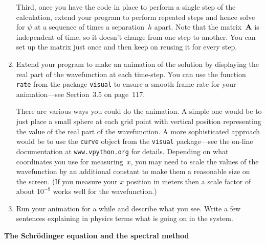 \documentclass[12pt]{article}
\begin{document}
\begin{exercises}
\begin{enumerate}
Third, once you have the code in place to perform a single step of the
calculation, extend your program to perform repeated steps and hence solve
for $\psi$ at a sequence of times a separation~$h$ apart.  Note that the
matrix~$\mathbf{A}$ is independent of time, so it doesn't change from one step
to another.  You can set up the matrix just once and then keep on reusing
it for every step.

\item Extend your program to make an animation of the solution by
  displaying the real part of the wavefunction at each time-step.  You can
  use the function \verb|rate| from the package \verb|visual| to ensure a
  smooth frame-rate for your animation---see Section~3.5 on page~117.

  There are various ways you could do the animation.  A simple one would be
  to just place a small sphere at each grid point with vertical position
  representing the value of the real part of the wavefunction.  A more
  sophisticated approach would be to use the \verb|curve| object
  from the \verb|visual| package---see the on-line documentation at
  \texttt{www.vpython.org} for details.  Depending on what coordinates you
  use for measuring~$x$, you may need to scale the values of the
  wavefunction by an additional constant to make them a reasonable size on
  the screen.  (If you measure your $x$ position in meters then a scale
  factor of about $10^{-9}$ works well for the wavefunction.)

\item Run your animation for a while and describe what you see.  Write a
  few sentences explaining in physics terms what is going on in the system.
\end{enumerate}




\exercise \textbf{The Schr\"odinger equation and the spectral method}


\end{exercises}
\end{document}
